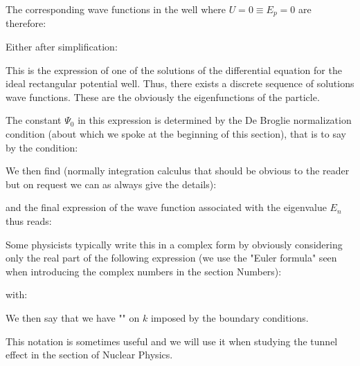 	The corresponding wave functions in the well where $U=0 \equiv E_p=0$ are therefore:
	
	Either after simplification:
	
	This is the expression of one of the solutions of the differential equation for the ideal rectangular potential well. Thus, there exists a discrete sequence of solutions wave functions. These are the obviously the eigenfunctions of the particle.

	The constant $\Psi_0$ in this expression is determined by the De Broglie normalization  condition (about which we spoke at the beginning of this section), that is to say by the condition:
	
	We then find (normally integration calculus that should be obvious to the reader but on request we can as always give the details):
	
	and the final expression of the wave function associated with the eigenvalue $E_n$ thus reads:
	
	Some physicists typically write this in a complex form by obviously considering only the real part of the following expression (we use the "Euler formula" seen when introducing the complex numbers in the section Numbers):
	
	with:
	
	We then say that we have "" on $k$ imposed by the boundary conditions.

	This notation is sometimes useful and we will use it when studying the tunnel effect in the section of Nuclear Physics.

